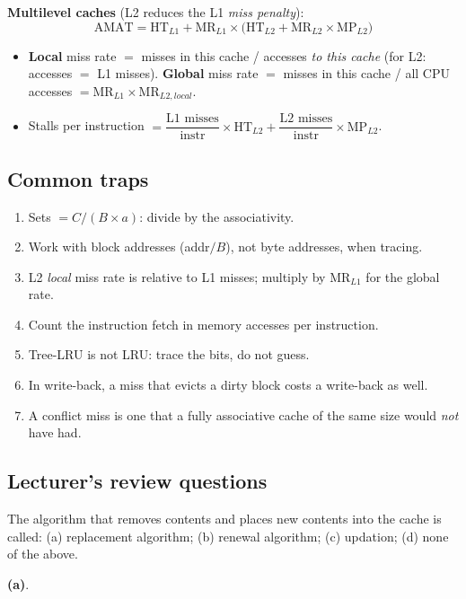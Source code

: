 \textbf{Multilevel caches} (L2 reduces the L1 \emph{miss penalty}):
\[
  \text{AMAT}=\text{HT}_{L1}+\text{MR}_{L1}\times\big(\text{HT}_{L2}+\text{MR}_{L2}\times\text{MP}_{L2}\big)
\]
\begin{itemize}[leftmargin=*]
  \item \textbf{Local} miss rate $=$ misses in this cache / accesses \emph{to this
  cache} (for L2: accesses $=$ L1 misses). \textbf{Global} miss rate $=$ misses in
  this cache / all CPU accesses $=\text{MR}_{L1}\times\text{MR}_{L2,local}$.
  \item Stalls per instruction $=\dfrac{\text{L1 misses}}{\text{instr}}\times
  \text{HT}_{L2}+\dfrac{\text{L2 misses}}{\text{instr}}\times\text{MP}_{L2}$.
\end{itemize}

\subsection{Common traps}
\begin{enumerate}[leftmargin=*]
  \item Sets $=C/(B\times a)$: divide by the associativity.
  \item Work with block addresses (addr$/B$), not byte addresses, when tracing.
  \item L2 \emph{local} miss rate is relative to L1 misses; multiply by
  $\text{MR}_{L1}$ for the global rate.
  \item Count the instruction fetch in memory accesses per instruction.
  \item Tree-LRU is not LRU: trace the bits, do not guess.
  \item In write-back, a miss that evicts a dirty block costs a write-back as well.
  \item A conflict miss is one that a fully associative cache of the same size
  would \emph{not} have had.
\end{enumerate}

\subsection{Lecturer's review questions}

\begin{exercise}[Lecturer 1]
The algorithm that removes contents and places new contents into the cache is
called: (a) replacement algorithm; (b) renewal algorithm; (c) updation; (d) none of
the above.
\end{exercise}
\begin{solution}
\textbf{(a)}.
\end{solution}

